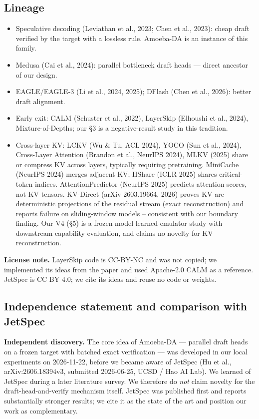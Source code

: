 \documentclass[11pt,a4paper]{article}
\begin{document}
\subsection{Lineage}
\begin{itemize}[leftmargin=*]
  \item Speculative decoding (Leviathan et al., 2023; Chen et al., 2023): cheap draft verified
        by the target with a lossless rule. Amoeba-DA is an instance of this family.
  \item Medusa (Cai et al., 2024): parallel bottleneck draft heads --- direct ancestor of our design.
  \item EAGLE/EAGLE-3 (Li et al., 2024, 2025); DFlash (Chen et al., 2026): better draft alignment.
  \item Early exit: CALM (Schuster et al., 2022), LayerSkip (Elhoushi et al., 2024),
        Mixture-of-Depths; our \S3 is a negative-result study in this tradition.
  \item Cross-layer KV: LCKV (Wu \& Tu, ACL 2024), YOCO (Sun et al., 2024), Cross-Layer
        Attention (Brandon et al., NeurIPS 2024), MLKV (2025) share or compress KV across
        layers, typically requiring pretraining. MiniCache (NeurIPS 2024) merges adjacent KV;
        HShare (ICLR 2025) shares critical-token indices. AttentionPredictor (NeurIPS 2025)
        predicts attention scores, not KV tensors. KV-Direct (arXiv 2603.19664, 2026) proves
        KV are deterministic projections of the residual stream (exact reconstruction) and
        reports failure on sliding-window models -- consistent with our boundary finding.
        Our V4 (\S5) is a frozen-model learned-emulator study with downstream capability
        evaluation, and claims no novelty for KV reconstruction.
\end{itemize}
\noindent\textbf{License note.} LayerSkip code is CC-BY-NC and was not copied; we implemented its
ideas from the paper and used Apache-2.0 CALM as a reference. JetSpec is CC BY 4.0; we cite its
ideas and reuse no code or weights.

\subsection{Independence statement and comparison with JetSpec}
\noindent\textbf{Independent discovery.} The core idea of Amoeba-DA --- parallel draft heads on
a frozen target with batched exact verification --- was developed in our local experiments on
2026-11-22, before we became aware of JetSpec (Hu et al., arXiv:2606.18394v3, submitted
2026-06-25, UCSD / Hao AI Lab). We learned of JetSpec during a later literature survey. We
therefore do \emph{not} claim novelty for the draft-head-and-verify mechanism itself. JetSpec
was published first and reports substantially stronger results; we cite it as the state of the
art and position our work as complementary.
\end{document}
